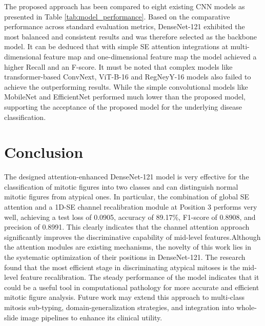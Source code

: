 \documentclass[conference]{IEEEtran}
\begin{document}
The proposed approach has been compared to eight existing CNN models as presented in Table \ref{tab:model_performance}. Based on the comparative performance across standard evaluation metrics, DenseNet-121 exhibited the most balanced and consistent results and was therefore selected as the backbone model. It can be deduced that with simple SE attention integrations at multi-dimensional feature map and one-dimensional feature map the model achieved a higher Recall and an F-score. It must be noted that complex models like transformer-based ConvNext, ViT-B-16 and RegNeyY-16 models also failed to achieve the outperforming results. While the simple convolutional models like MobileNet and EfficientNet performed much lower than the proposed model, supporting the acceptance of the proposed model for the underlying disease classification.

\section{Conclusion}
The designed attention-enhanced DenseNet-121 model is very effective for the classification of mitotic figures into two classes and can distinguish normal mitotic figures from atypical ones. In particular, the combination of global SE attention and a 1D-SE channel recalibration module at Position 3 performs very well, achieving a test loss of 0.0905, accuracy of 89.17\%, F1-score of 0.8908, and precision of 0.8991. This clearly indicates that the channel attention approach significantly improves the discriminative capability of mid-level features.Although the attention modules are existing mechanisms, the novelty of this work lies in the systematic optimization of their positions in DenseNet-121. The research found that the most efficient stage in discriminating atypical mitoses is the mid-level feature recalibration.  The steady performance of the model indicates that it could be a useful tool in computational pathology for more accurate and efficient mitotic figure analysis. Future work may extend this approach to multi-class mitosis sub-typing, domain-generalization strategies, and integration into whole-slide image pipelines to enhance its clinical utility.
\end{document}
